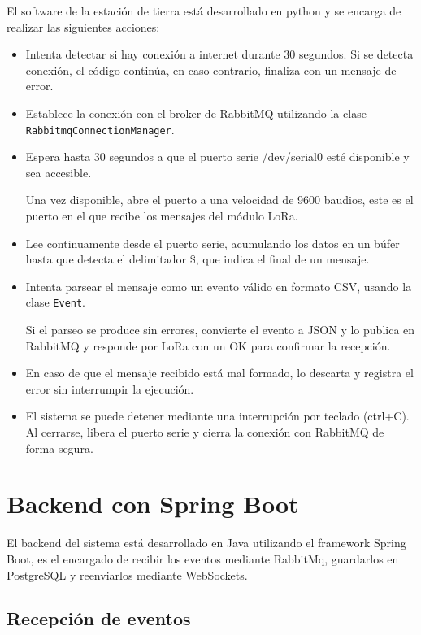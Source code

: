 El software de la estación de tierra está desarrollado en python y se encarga de realizar las siguientes acciones:

\begin{itemize}
    \item Intenta detectar si hay conexión a internet durante 30 segundos.
    Si se detecta conexión, el código continúa, en caso contrario, finaliza con un mensaje de error.
    \item Establece la conexión con el broker de RabbitMQ utilizando la clase \texttt{RabbitmqConnectionManager}.
    \item Espera hasta 30 segundos a que el puerto serie /dev/serial0 esté disponible y sea accesible.

    Una vez disponible, abre el puerto a una velocidad de 9600 baudios, este es el puerto en el que recibe los mensajes del módulo LoRa.
    \item Lee continuamente desde el puerto serie, acumulando los datos en un búfer hasta que detecta el delimitador \$, que indica el final de un mensaje.
    \item Intenta parsear el mensaje como un evento válido en formato CSV, usando la clase \texttt{Event}.

    Si el parseo se produce sin errores, convierte el evento a JSON y lo publica en RabbitMQ y responde por LoRa con un OK para confirmar la recepción.
    \item En caso de que el mensaje recibido está mal formado, lo descarta y registra el error sin interrumpir la ejecución.
    \item El sistema se puede detener mediante una interrupción por teclado (ctrl+C). Al cerrarse, libera el puerto serie y cierra la conexión con RabbitMQ de forma segura.
\end{itemize}


\section{Backend con Spring Boot}

El backend del sistema está desarrollado en Java utilizando el framework Spring Boot, es el encargado de recibir los eventos mediante RabbitMq, guardarlos en PostgreSQL y reenviarlos mediante WebSockets.

\subsection{Recepción de eventos}

